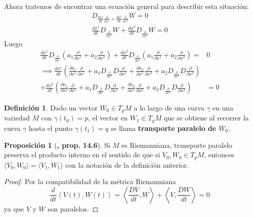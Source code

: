 \documentclass[spanish]{book}
\theoremstyle{definition}
\newtheorem*{defn}{Definición}
\newtheorem*{prop}{Proposición}
\begin{document}
	Ahora tratemos de encontrar una ecuación general para describir esta situación:
	\begin{align*}
		D_{\frac{d x^1}{dt}\frac{\partial}{\partial x^1}+\frac{d x^2}{d t}\frac{\partial}{\partial x^2}}W=0\\
		\frac{d x^1}{dt}D_{\frac{\partial}{\partial x^1}}W+\frac{dx^2}{dt}D_{\frac{\partial}{\partial x^2}}W=0
	\end{align*}
	Luego
	\begin{align*}
		\frac{dx^1}{dt}D_{\frac{\partial}{\partial x^1}}\left(a_1\frac{\partial}{\partial x^1}+a_2\frac{\partial}{\partial x^2}\right)+\frac{dx^2}{dt}D_{\frac{\partial}{\partial x^2}}\left(a_1\frac{\partial}{\partial x^1}+a_2\frac{\partial}{\partial x^2}\right)=&0\\
		\implies \frac{dx^1}{dt}\left(\frac{\partial a_1}{\partial x^1}\frac{\partial}{\partial x^1}+a_1D_{\frac{\partial}{\partial x^1}}D\frac{\partial}{\partial x^1}+
		\frac{\partial a_2}{\partial x^1}\frac{\partial}{\partial x^2}+a_2D_{\frac{\partial}{\partial x^1}}D\frac{\partial}{\partial x^2}\right)\\
		+ \frac{dx^2}{dt}\left(\frac{\partial a_1}{\partial x^1}\frac{\partial}{\partial x^1}+a_1D_{\frac{\partial}{\partial x^1}}D\frac{\partial}{\partial x^1}+
		\frac{\partial a_2}{\partial x^1}\frac{\partial}{\partial x^2}+a_2D_{\frac{\partial}{\partial x^1}}D\frac{\partial}{\partial x^2}\right)&=0
	\end{align*}
	
	\begin{defn}
		Dado un vector $W_0\in T_pM$ a lo largo de una curva $\gamma$ en una variedad $M$ con $\gamma(t_0)=p$, el vector en $W_1\in T_qM$ que se obtiene al recorrer la curva $\gamma$ hasta el punto $\gamma(t_1)=q$ se llama \textbf{transporte paralelo de $W_0$}.
	\end{defn}
	
	\begin{prop}[\cite{Loring-dif}\textbf{, prop. 14.6}]
		Si $M$ es Riemanniana, transporte paralelo preserva el producto interno en el sentido de que si $V_0,W_0\in T_pM$, entonces $\langle V_0,W_0\rangle=\langle V_1,W_1\rangle$ con la notación de la definición anterior.
	\end{prop}
	\begin{proof}
		Por la compatibilidad de la métrica Riemanniana
		\[\frac{d}{dt}\left\langle V(t),W(t)\right\rangle=\left\langle \frac{DV}{dt},W\right\rangle+\left\langle V,\frac{DW}{dt}\right\rangle=0\]
		ya que $V$ y $W$ son paralelos.
	\end{proof}
	
\end{document}
